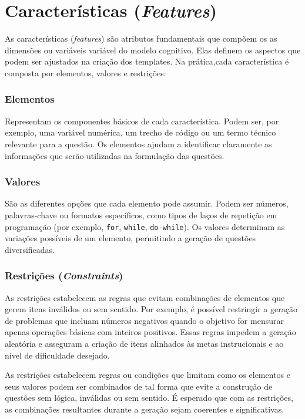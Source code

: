 \section{Características (\textit{Features})}



As características (\textit{features}) são atributos fundamentais que compõem os as dimensões ou variáveis variável do modelo cognitivo. Elas definem os aspectos que podem ser ajustados na criação dos templates. Na prática,cada característica é composta por elementos, valores e restrições:


\subsubsection{Elementos}
Representam os componentes básicos de cada característica. Podem ser, por exemplo, uma variável numérica, um trecho de código ou um termo técnico relevante para a questão. Os elementos ajudam a identificar claramente as informações que serão utilizadas na formulação das questões.


\subsubsection{Valores}
São as diferentes opções que cada elemento pode assumir. Podem ser números, palavras-chave ou formatos específicos, como tipos de laços de repetição em programação (por exemplo, \texttt{for}, \texttt{while}, \texttt{do-while}). Os valores determinam as variações possíveis de um elemento, permitindo a geração de questões diversificadas.

\subsubsection{Restrições (\textit{Constraints})}
As restrições estabelecem as regras que evitam combinações de elementos que gerem itens inválidos ou sem sentido. Por exemplo, é possível restringir a geração de problemas que incluam números negativos quando o objetivo for mensurar apenas operações básicas com inteiros positivos. Essas regras impedem a geração aleatória e asseguram a criação de itens alinhados às metas instrucionais e ao nível de dificuldade desejado.

As restrições estabelecem regras ou condições que limitam como os elementos e seus valores podem ser combinados de tal forma que evite a construção de questões sem lógica, inválidas ou sem sentido. É esperado que com as restrições, as combinações resultantes durante a geração sejam coerentes e significativas. 

